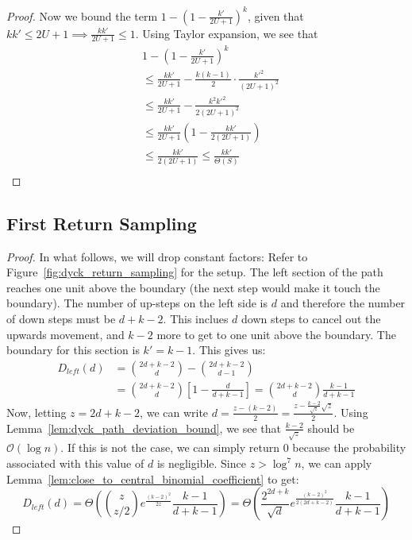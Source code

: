 \DTotalNearBoundary*
\begin{proof}
Now we bound the term $1-\left(1-\frac{k'}{2U+1}\right)^k$, given that $kk'\le 2U+1\implies\frac{kk'}{2U+1} \le 1$.
Using Taylor expansion, we see that
\begin{align}
&1 - \left(1 - \frac{k'}{2U+1}\right)^k\\
&\le \frac{kk'}{2U+1} - \frac{k(k-1)}{2}\cdot\frac{k'^2}{(2U+1)^2}\\
&\le \frac{kk'}{2U+1} - \frac{k^2k'^2}{2(2U+1)^2}\\
&\le \frac{kk'}{2U+1} \left(1 - \frac{kk'}{2(2U+1)}\right)\\
&\le \frac{kk'}{2(2U+1)} \le \frac{kk'}{\Theta(S)}\\
\end{align}
\end{proof}



\subsection{First Return Sampling}%
\label{sub:first_return_sampling}

\ReturnDLeftBound*
\begin{proof}
In what follows, we will drop constant factors:
Refer to Figure~\ref{fig:dyck_return_sampling} for the setup.
The left section of the path reaches one unit above the boundary (the next step would make it touch the boundary).
The number of up-steps on the left side is $d$ and therefore the number of down steps must be $d + k - 2$.
This inclues $d$ down steps to cancel out the upwards movement, and $k-2$ more to get to one unit above the boundary.
The boundary for this section is $k' = k-1$. This gives us:
\begin{align}
D_{left}(d) &= \binom{2d+k-2}{d} - \binom{2d+k-2}{d-1}\\
&= \binom{2d+k-2}{d}\left[ 1-\frac{d}{d+k-1}\right] = \binom{2d+k-2}{d}\frac{k-1}{d+k-1}
\end{align}
Now, letting $z = 2d+k-2$,  we can write $d = \frac{z-(k-2)}{2} = \frac{z-\frac{k-2}{\sqrt z}\sqrt z}{2}$.
Using Lemma~\ref{lem:dyck_path_deviation_bound}, we see that $\frac{k-2}{\sqrt z}$ should be $\mathcal O(\log n)$.
If this is not the case, we can simply return $0$ because the probability associated with this value of $d$ is negligible.
Since $z > \log^7 n$, we can apply Lemma~\ref{lem:close_to_central_binomial_coefficient} to get:
\[
D_{left}(d) = \Theta\left( \binom{z}{z/2} e^{\frac{(k-2)^2}{2z}} \frac{k-1}{d+k-1} \right)
= \Theta\left( \frac{2^{2d+k}}{\sqrt d} e^{\frac{(k-2)^2}{2(2d+k-2)}} \frac{k-1}{d+k-1} \right)
\]
\end{proof}


